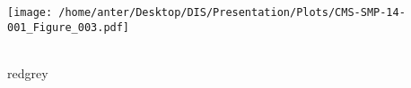 \documentclass{beamer}
\begin{document}
\begin{frame}
\hspace*{-10mm}
\begin{minipage}[thbp]{0.1\textwidth}
\vspace{13mm}
\hspace*{-4mm}\texttt{[image: /home/anter/Desktop/DIS/Presentation/Plots/CMS-SMP-14-001\_Figure\_003.pdf]}\\ \\
\hspace*{35mm}\begin{beamercolorbox}[wd=23mm,ht=1mm,center,shadow=true, rounded=true]{redgrey}
{}
{\scalebox {0.61} {}}
\end{beamercolorbox}
\end{minipage}
\end{frame}
\end{document}
